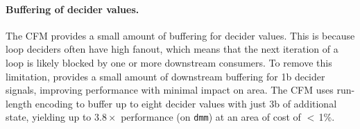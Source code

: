 


\paragraph{Buffering of decider values.}
The CFM provides a small amount of buffering for decider values.
% 
This is because loop deciders often have high fanout, which means that the next iteration of a loop is likely blocked by one or more downstream consumers.
% 
To remove this limitation, \riptide provides a small amount of downstream buffering for 1b decider signals, improving performance with minimal impact on area.
%
The CFM uses run-length encoding to buffer up to eight decider values with just 3b of additional state, yielding up to $3.8\times$ performance (on {\tt dmm}) at an area of cost of $<$\,1\%.

